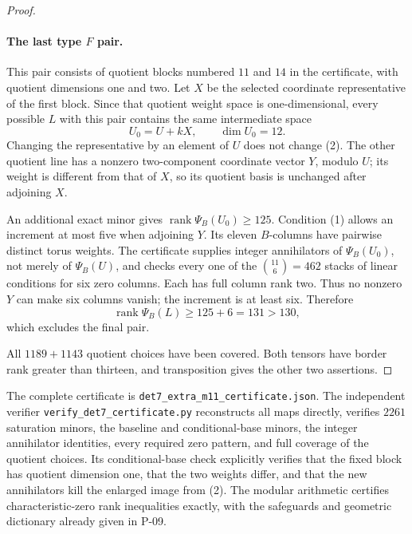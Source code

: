 \begin{proof}
\paragraph{The last type \(F\) pair.}
This pair consists of quotient blocks numbered \(11\)
and \(14\) in the certificate, with quotient dimensions
one and two. Let \(X\) be the selected coordinate
representative of the first block. Since that quotient
weight space is one-dimensional, every possible \(L\)
with this pair contains the same intermediate space
\[
 U_0=U+kX,\qquad \dim U_0=12.
 \tag{2}
\]
Changing the representative by an element of \(U\)
does not change (2). The other quotient line has a
nonzero two-component coordinate vector \(Y\), modulo
\(U\); its weight is different from that of \(X\), so
its quotient basis is unchanged after adjoining \(X\).

An additional exact minor gives
\(\operatorname{rank}\Psi_B(U_0)\geq125\).
Condition (1) allows an increment at most five when
adjoining \(Y\). Its eleven \(B\)-columns have pairwise
distinct torus weights. The certificate supplies
integer annihilators of \(\Psi_B(U_0)\), not merely
of \(\Psi_B(U)\), and checks every one of the
\(\binom{11}{6}=462\) stacks of linear conditions for
six zero columns. Each has full column rank two.
Thus no nonzero \(Y\) can make six columns vanish;
the increment is at least six. Therefore
\[
 \operatorname{rank}\Psi_B(L)\geq125+6=131>130,
\]
which excludes the final pair.

All \(1189+1143\) quotient choices have been covered.
Both tensors have border rank greater than thirteen,
and transposition gives the other two assertions.
\end{proof}

The complete certificate is
\texttt{det7\_extra\_m11\_certificate.json}.
The independent verifier
\texttt{verify\_det7\_certificate.py} reconstructs all
maps directly, verifies \(2261\) saturation minors,
the baseline and conditional-base minors, the integer
annihilator identities, every required zero pattern,
and full coverage of the quotient choices. Its
conditional-base check explicitly verifies that the
fixed block has quotient dimension one, that the two
weights differ, and that the new annihilators kill
the enlarged image from (2).
The modular arithmetic certifies characteristic-zero
rank inequalities exactly, with the safeguards and
geometric dictionary already given in P-09.
